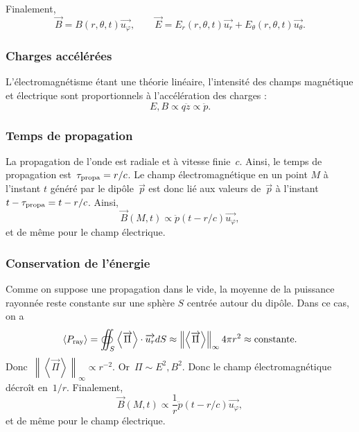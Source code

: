 Finalement,
\begin{equation*}
    \boxed{
        \vec{B}=B(r,\theta,t)\vec{u_{\varphi}},\qquad
        \vec{E}=E_{r}(r,\theta,t)\vec{u_r}+E_{\theta}(r,\theta,t)\vec{u_{\theta}}.
    }
\end{equation*}

\subsubsection{Charges accélérées}

L'électromagnétisme étant une théorie linéaire, l'intensité des champs magnétique et électrique sont proportionnels à l'accélération des charges :
\begin{equation*}
    \boxed{
        E,B\propto q\ddot{z}\propto\ddot{p}.
    }
\end{equation*}

\subsubsection{Temps de propagation}

La propagation de l'onde est radiale et à vitesse finie~$c$. Ainsi, le temps de propagation est~$\tau_{\rm propa}=r/c$. Le champ électromagnétique en un point $M$ à l'instant $t$ généré par le dipôle~$\vec{p}$ est donc lié aux valeurs de~$\vec{p}$ à l'instant $t-\tau_{\rm propa}=t-r/c$. Ainsi,
\begin{equation*}
    \boxed{
        \vec{B}(M,t)\propto\ddot{p}(t-r/c)\vec{u_{\varphi}},
    }
\end{equation*}
et de même pour le champ électrique.

\subsubsection{Conservation de l'énergie}

Comme on suppose une propagation dans le vide, la moyenne de la puissance rayonnée reste constante sur une sphère $S$ centrée autour du dipôle. Dans ce cas, on a 
\begin{equation*}
    \left\langle P_{\rm ray}\right\rangle=\oiint_{S}\left\langle\vec{\Pi}\right\rangle\cdot\vec{u_r}dS\approx\left\lVert\left\langle\vec{\Pi}\right\rangle\right\rVert_{\infty}4\pi r^{2}\approx{\rm constante}.
\end{equation*}
Donc~$\left\lVert\left\langle\vec{\Pi}\right\rangle\right\rVert_{\infty}\propto r^{-2}$. Or~$\Pi\sim E^{2},B^{2}$. Donc le champ électromagnétique décroît en~$1/r$. Finalement,
\begin{equation*}
    \boxed{
        \vec{B}(M,t)\propto\frac{1}{r}\ddot{p}(t-r/c)\vec{u_{\varphi}},
    }
\end{equation*}
et de même pour le champ électrique.

